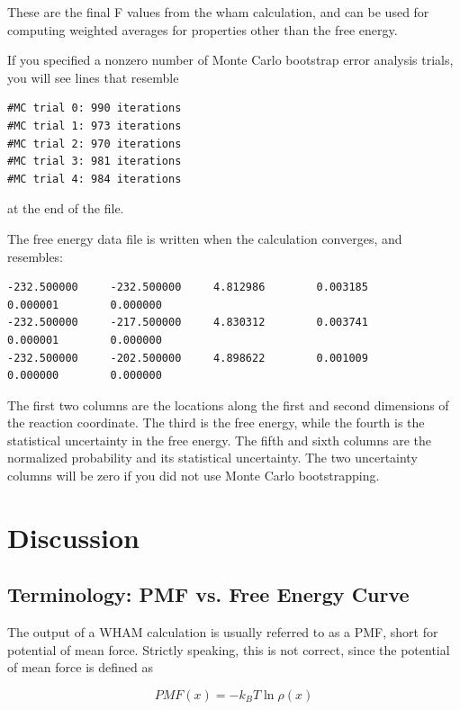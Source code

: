 \documentclass[12pt]{article}
\begin{document}
These are the final F values from the wham calculation, and can be used for
computing weighted averages for properties other than the free energy.

If you specified a nonzero number of Monte Carlo bootstrap error analysis
trials, you will see lines that resemble

\begin{verbatim}
#MC trial 0: 990 iterations
#MC trial 1: 973 iterations
#MC trial 2: 970 iterations
#MC trial 3: 981 iterations
#MC trial 4: 984 iterations
\end{verbatim}
at the end of the file.

The free energy data file is written when the calculation converges, and
resembles:

\begin{footnotesize}
\begin{verbatim}
-232.500000     -232.500000     4.812986        0.003185        0.000001        0.000000
-232.500000     -217.500000     4.830312        0.003741        0.000001        0.000000
-232.500000     -202.500000     4.898622        0.001009        0.000000        0.000000
\end{verbatim}
\end{footnotesize}


The first two columns are the locations along the first and second
dimensions of the reaction coordinate.  The third is the free energy, while
the fourth is the statistical uncertainty in the free energy.  The fifth
and sixth columns are the normalized probability and its statistical
uncertainty.  The two uncertainty columns will be zero if you did not use
Monte Carlo bootstrapping.

\section{Discussion}

\subsection{Terminology: PMF vs. Free Energy Curve}

The output of a WHAM calculation is usually referred to as a PMF, short for
potential of mean force. Strictly speaking, this is not correct, since the
potential of mean force is defined as

\begin{equation}
    PMF(x) = -k_B T \ln \rho(x)
\end{equation}
\end{document}
